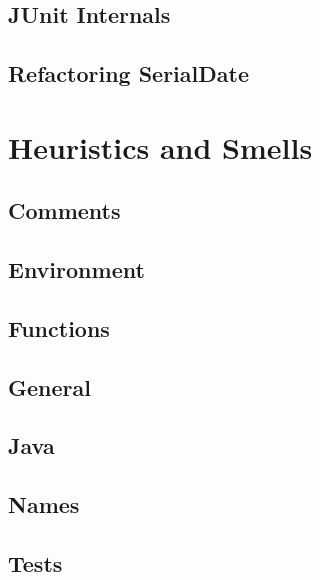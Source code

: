 \documentclass[a4paper, twocolumn]{article}
\begin{document}
\subsection{JUnit Internals}

\subsection{Refactoring SerialDate}


\section{Heuristics and Smells}

\subsection{Comments}

\subsection{Environment}

\subsection{Functions}

\subsection{General}

\subsection{Java}

\subsection{Names}

\subsection{Tests}
\end{document}
